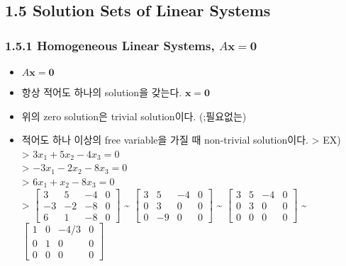 \documentclass[11pt]{article}
\providecommand{\tightlist}{%
      \setlength{\itemsep}{0pt}\setlength{\parskip}{0pt}}
\begin{document}
\hypertarget{solution-sets-of-linear-systems}{%
\subsection{1.5 Solution Sets of Linear
Systems}\label{solution-sets-of-linear-systems}}

\hypertarget{homogeneous-linear-systems-amathbfx-mathbf0}{%
\subsubsection{\texorpdfstring{1.5.1 Homogeneous Linear Systems,
\(A\mathbf{x} = \mathbf{0}\)}{1.5.1 Homogeneous Linear Systems, A\textbackslash{}mathbf\{x\} = \textbackslash{}mathbf\{0\}}}\label{homogeneous-linear-systems-amathbfx-mathbf0}}

\begin{itemize}
\tightlist
\item
  \(A\mathbf{x} = \mathbf{0}\)
\item
  항상 적어도 하나의 solution을 갖는다. \(\mathbf{x}=\mathbf{0}\)
\item
  위의 zero solution은 trivial solution이다. (;필요없는)
\item
  적어도 하나 이상의 free variable을 가질 때 non-trivial solution이다.
  \textgreater{} EX)\\
  \textgreater{} \(3x_{1} + 5x_{2} - 4x_{3} = 0\)\\
  \textgreater{} \(-3x_{1} - 2x_{2} - 8x_{3} = 0\)\\
  \textgreater{} \(6x_{1} + x_{2} - 8x_{3} = 0\)\\
  \textgreater{}
  \(\begin{bmatrix} 3 & 5 & -4 & 0 \\ -3 & -2 & -8 & 0 \\ 6 & 1 & -8 & 0\end{bmatrix}\)
  \textbf{\textasciitilde{}}
  \(\begin{bmatrix} 3 & 5 & -4 & 0 \\ 0 & 3 & 0 & 0 \\ 0 & -9 & 0 & 0\end{bmatrix}\)
  \textbf{\textasciitilde{}}
  \(\begin{bmatrix} 3 & 5 & -4 & 0 \\ 0 & 3 & 0 & 0 \\ 0 & 0 & 0 & 0\end{bmatrix}\)
  \textbf{\textasciitilde{}}
  \(\begin{bmatrix} 1 & 0 & -4/3 & 0 \\ 0 & 1 & 0 & 0 \\ 0 & 0 & 0 & 0\end{bmatrix}\)\\

\end{itemize}
\end{document}
